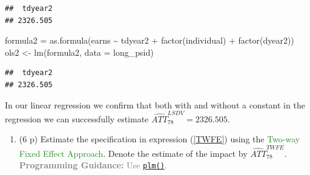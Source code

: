 \documentclass[
]{article}
\newenvironment{Shaded}{\begin{snugshade}}{\end{snugshade}}
\newcommand{\AttributeTok}[1]{\textcolor[rgb]{0.77,0.63,0.00}{#1}}
\newcommand{\FunctionTok}[1]{\textcolor[rgb]{0.00,0.00,0.00}{#1}}
\newcommand{\NormalTok}[1]{#1}
\newcommand{\OtherTok}[1]{\textcolor[rgb]{0.56,0.35,0.01}{#1}}
\newcommand{\SpecialCharTok}[1]{\textcolor[rgb]{0.00,0.00,0.00}{#1}}
\newcommand{\StringTok}[1]{\textcolor[rgb]{0.31,0.60,0.02}{#1}}
\providecommand{\tightlist}{%
  \setlength{\itemsep}{0pt}\setlength{\parskip}{0pt}}
\begin{document}
\begin{Shaded}
\end{Shaded}

\begin{verbatim}
##  tdyear2 
## 2326.505
\end{verbatim}

\begin{Shaded}
\begin{Highlighting}[]
\NormalTok{formula2 }\OtherTok{=} \FunctionTok{as.formula}\NormalTok{(earns }\SpecialCharTok{\textasciitilde{}}\NormalTok{ tdyear2 }\SpecialCharTok{+} \FunctionTok{factor}\NormalTok{(individual) }\SpecialCharTok{+} \FunctionTok{factor}\NormalTok{(dyear2))}
\NormalTok{ols2 }\OtherTok{\textless{}{-}} \FunctionTok{lm}\NormalTok{(formula2, }\AttributeTok{data =}\NormalTok{ long\_psid)}
\end{Highlighting}
\end{Shaded}

\begin{Shaded}
\end{Shaded}

\begin{verbatim}
##  tdyear2 
## 2326.505
\end{verbatim}

In our linear regression we confirm that both with and without a
constant in the regression we can successfully estimate
\(\widehat{ATT}_{78}^{LSDV} = 2326.505\).

\begin{enumerate}
\def\labelenumi{\arabic{enumi}.}
\setcounter{enumi}{3}
\tightlist
\item
  (6 p) Estimate the specification in expression (\ref{TWFE}) using the
  \textcolor{ForestGreen}{Two-way Fixed Effect Approach}. Denote the
  estimate of the impact by \(\widehat{ATT}_{78}^{TWFE}\).
  \textcolor{Gray}{\textbf{Programming Guidance:} Use \href{https://www.rdocumentation.org/packages/plm/versions/2.6-3/topics/plm}{\texttt{plm()}}.}\label{item:twfe}
\end{enumerate}
\end{document}

